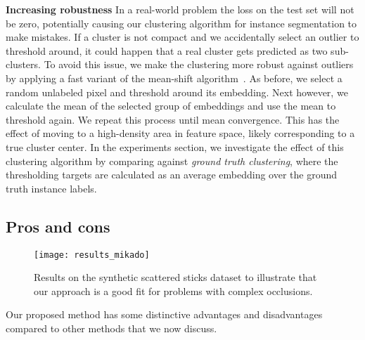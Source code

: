 \documentclass[10pt,twocolumn,letterpaper]{article}
\begin{document}
\textbf{Increasing robustness} In a real-world problem the loss on the test set will not be zero, potentially causing our clustering algorithm for instance segmentation to make mistakes. If a cluster is not compact and we accidentally select an outlier to threshold around, it could happen that a real cluster gets predicted as two sub-clusters. To avoid this issue, we make the clustering more robust against outliers by applying a fast variant of the mean-shift algorithm~\cite{FukunagaMeanShift}. As before, we select a random unlabeled pixel and threshold around its embedding. Next however, we calculate the mean of the selected group of embeddings and use the mean to threshold again. We repeat this process until mean convergence.
This has the effect of moving to a high-density area in feature space, likely corresponding to a true cluster center. In the experiments section, we investigate the effect of this clustering algorithm by comparing against \textit{ground truth clustering}, where the thresholding targets are calculated as an average embedding over the ground truth instance labels.

\subsection{Pros and cons}
\label{subsec:prosandcons}
\begin{figure}[t]
	\begin{center}
\texttt{[image: results\_mikado]}
	\end{center}
	\caption{Results on the synthetic scattered sticks dataset to illustrate that our approach is a good fit for problems with complex occlusions.}
	\label{fig:mikado}
\end{figure}
Our proposed method has some distinctive advantages and disadvantages compared to other methods that we now discuss.
\end{document}
